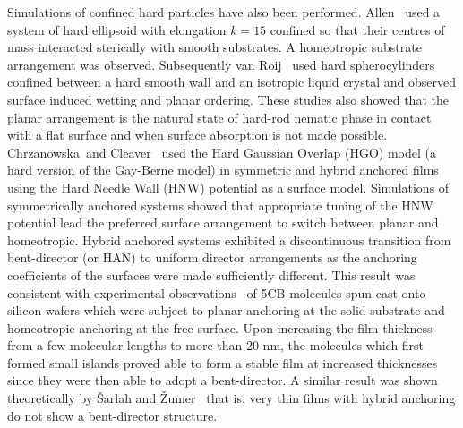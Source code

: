 Simulations of confined hard particles have also been performed. Allen~\cite{Allen99} used a system of 
hard ellipsoid with elongation $k=15$ confined so that their centres of mass interacted 
sterically with smooth substrates. A homeotropic substrate arrangement was observed.
Subsequently van Roij~\etal\cite{VanRoijDijkstra00, VanRoijDijkstra00a, DijkstraVanRoij01} used hard
spherocylinders confined between a hard smooth wall and an isotropic liquid crystal and observed
surface induced wetting and planar ordering. These studies also showed that the planar
arrangement is the natural state of hard-rod nematic phase in contact with a flat surface and 
when surface absorption is not made possible.\\
Chrzanowska~\etal and Cleaver~\etal\cite{Chrzanowska_Teixera_01, Cleaver_Teixeira_01} used the
Hard Gaussian Overlap (HGO) model (\ie a hard version of the Gay-Berne model) in symmetric and hybrid
anchored films using the Hard Needle Wall (HNW) potential as a surface model. 
Simulations of symmetrically anchored systems showed that appropriate tuning of the 
HNW potential lead the preferred surface arrangement to switch between planar and homeotropic. 
Hybrid anchored systems exhibited  a discontinuous transition from bent-director (or HAN) to
uniform director arrangements as the
anchoring coefficients of the surfaces were made sufficiently different. This result was
consistent with 
experimental observations~\cite{VandenbrouckValignat99} of 5CB molecules spun cast onto 
silicon wafers which were subject to
planar anchoring at the solid substrate and homeotropic anchoring at the free surface. Upon
increasing the film thickness from a few molecular lengths to more than 20 nm, the molecules
which first formed small islands proved able to form a stable film at increased thicknesses 
since they were then able to adopt a bent-director. 
A similar result was shown theoretically by \v{S}arlah and \v{Z}umer~\cite{SarlahZummer99} 
that is, very thin films with hybrid anchoring do not show a bent-director structure.\\

